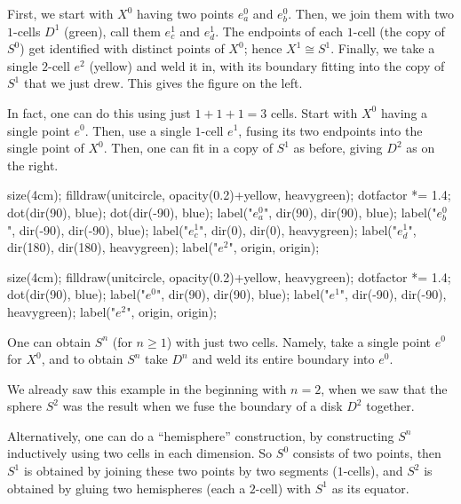 \begin{example}
	\listhack
	\begin{enumerate}[(a)]
	\ii First, we start with $X^0$ having two points $e_a^0$ and $e_b^0$.
	Then, we join them with two $1$-cells $D^1$ (green),
	call them $e_c^1$ and $e_d^1$.
	The endpoints of each $1$-cell (the copy of $S^0$) get identified
	with distinct points of $X^0$; hence $X^1 \cong S^1$.
	Finally, we take a single $2$-cell $e^2$ (yellow) and weld it in,
	with its boundary fitting into the copy of $S^1$ that we just drew.
	This gives the figure on the left.

	\ii In fact, one can do this using just $1+1+1=3$ cells.
	Start with $X^0$ having a single point $e^0$.
	Then, use a single $1$-cell $e^1$, fusing its two endpoints
	into the single point of $X^0$.
	Then, one can fit in a copy of $S^1$ as before,
	giving $D^2$ as on the right.
	\end{enumerate}
	\begin{center}
		\begin{asy}
			size(4cm);
			filldraw(unitcircle, opacity(0.2)+yellow, heavygreen);
			dotfactor *= 1.4;
			dot(dir(90), blue);
			dot(dir(-90), blue);
			label("$e_a^0$", dir(90), dir(90), blue);
			label("$e_b^0$", dir(-90), dir(-90), blue);
			label("$e_c^1$", dir(0), dir(0), heavygreen);
			label("$e_d^1$", dir(180), dir(180), heavygreen);
			label("$e^2$", origin, origin);
		\end{asy}
		\qquad
		\begin{asy}
			size(4cm);
			filldraw(unitcircle, opacity(0.2)+yellow, heavygreen);
			dotfactor *= 1.4;
			dot(dir(90), blue);
			label("$e^0$", dir(90), dir(90), blue);
			label("$e^1$", dir(-90), dir(-90), heavygreen);
			label("$e^2$", origin, origin);
		\end{asy}
	\end{center}
\end{example}

\begin{example}
	[$S^n$ as a CW complex]
	\listhack
	\begin{enumerate}[(a)]
		\ii One can obtain $S^n$ (for $n \ge 1$) with just two cells.
		Namely, take a single point $e^0$ for $X^0$, and to obtain $S^n$
		take $D^n$ and weld its entire boundary into $e^0$.

		We already saw this example in the beginning with $n=2$,
		when we saw that the sphere $S^2$ was the result when we fuse
		the boundary of a disk $D^2$ together.
		
		\ii Alternatively, one can do a ``hemisphere'' construction,
		by constructing $S^n$ inductively using two cells in each dimension.
		So $S^0$ consists of two points, then $S^1$ is obtained
		by joining these two points by two segments ($1$-cells),
		and $S^2$ is obtained by gluing two hemispheres (each a $2$-cell)
		with $S^1$ as its equator.
	\end{enumerate}
\end{example}

